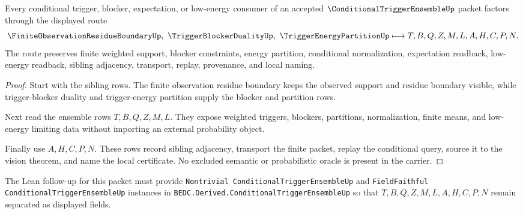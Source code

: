 \begin{theorem}
\label{thm:conditional-trigger-ensemble-sibling-route}
Every conditional trigger, blocker, expectation, or low-energy consumer of an accepted $\ConditionalTriggerEnsembleUp$ packet factors through the displayed route
$$
\FiniteObservationResidueBoundaryUp,\ \TriggerBlockerDualityUp,\ \TriggerEnergyPartitionUp \longmapsto T,B,Q,Z,M,L,A,H,C,P,N .
$$
The route preserves finite weighted support, blocker constraints, energy partition, conditional normalization, expectation readback, low-energy readback, sibling adjacency, transport, replay, provenance, and local naming.
\end{theorem}
\begin{proof}
Start with the sibling rows. The finite observation residue boundary keeps the observed support and residue boundary visible, while trigger-blocker duality and trigger-energy partition supply the blocker and partition rows.

Next read the ensemble rows $T,B,Q,Z,M,L$. They expose weighted triggers, blockers, partitions, normalization, finite means, and low-energy limiting data without importing an external probability object.

Finally use $A,H,C,P,N$. These rows record sibling adjacency, transport the finite packet, replay the conditional query, source it to the vision theorem, and name the local certificate. No excluded semantic or probabilistic oracle is present in the carrier.
\end{proof}



The Lean follow-up for this packet must provide \texttt{Nontrivial ConditionalTriggerEnsembleUp} and \texttt{FieldFaithful ConditionalTriggerEnsembleUp} instances in \texttt{BEDC.Derived.ConditionalTriggerEnsembleUp} so that $T,B,Q,Z,M,L,A,H,C,P,N$ remain separated as displayed fields.

